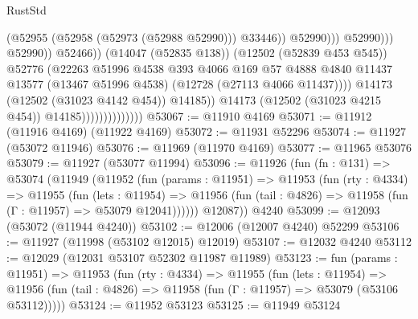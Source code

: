 \begin{lexlean}{RustStd}
\begin{coremodule}
                                                            (@52955
                                                              (@52958 (@52973 (@52988 @52990)))
                                                              @33446))
                                                          @52990)))
                                                    @52990)))
                                              @52990))
                                          @52466))
                                      (@14047 (@52835 @138))
                                      (@12502 (@52839 @453 @545))
                                      @52776
                                      (@22263
                                        @51996
                                        @4538
                                        @393
                                        @4066
                                        @169
                                        @57
                                        @4888
                                        @4840
                                        @11437
                                        @13577
                                        (@13467 @51996 @4538)
                                        (@12728 (@27113 @4066 @11437))))
                                    @14173
                                    (@12502 (@31023 @4142 @454))
                                    @14185))
                                @14173
                                (@12502 (@31023 @4215 @454))
                                @14185))))))))))))))
@53067 := @11910 @4169
@53071 := @11912 (@11916 @4169) (@11922 @4169)
@53072 := @11931 @52296
@53074 := @11927 (@53072 @11946)
@53076 := @11969 (@11970 @4169)
@53077 := @11965 @53076
@53079 := @11927 (@53077 @11994)
@53096 := @11926
    (fun (fn : @131) =>
    @53074
      (@11949
        (@11952
          (fun (params : @11951) =>
          @11953
            (fun (rty : @4334) =>
            @11955
              (fun (lets : @11954) =>
              @11956 (fun (tail : @4826) => @11958 (fun (Γ : @11957) => @53079 @12041))))))
        @12087))
    @4240
@53099 := @12093 (@53072 (@11944 @4240))
@53102 := @12006 (@12007 @4240) @52299
@53106 := @11927 (@11998 (@53102 @12015) @12019)
@53107 := @12032 @4240
@53112 := @12029 (@12031 @53107 @52302 @11987 @11989)
@53123 := fun (params : @11951) =>
  @11953
    (fun (rty : @4334) =>
    @11955
      (fun (lets : @11954) =>
      @11956 (fun (tail : @4826) => @11958 (fun (Γ : @11957) => @53079 (@53106 @53112)))))
@53124 := @11952 @53123
@53125 := @11949 @53124

\end{coremodule}
\end{lexlean}
